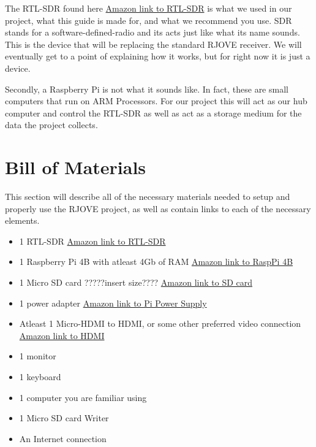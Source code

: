 \documentclass[letterpaper,12pt,notitlepage]{report} %
\begin{document}
The RTL-SDR found here \href{https://www.amazon.com/RTL-SDR-Blog-RTL2832U-Software-Defined/dp/B0129EBDS2}{Amazon link to RTL-SDR} is what we used in our project, what this guide is made for, and what we recommend you use. SDR stands for a software-defined-radio and its acts just like what its name sounds. This is the device that will be replacing the standard RJOVE receiver. We will eventually get to a point of explaining how it works, but for right now it is just a device.

Secondly, a Raspberry Pi is not what it sounds like. In fact, these are small computers that run on ARM Processors. For our project this will act as our hub computer and control the RTL-SDR as well as act as a storage medium for the data the project collects.

\section{Bill of Materials}
This section will describe all of the necessary materials needed to setup and properly use the RJOVE project, as well as contain links to each of the necessary elements.
\begin{itemize}
	\item 1 RTL-SDR \href{https://www.amazon.com/RTL-SDR-Blog-RTL2832U-Software-Defined/dp/B0129EBDS2}{Amazon link to RTL-SDR}
	\item 1 Raspberry Pi 4B with atleast 4Gb of RAM \href{https://www.amazon.com/Raspberry-Model-2019-Quad-Bluetooth/dp/B07TC2BK1X/ref=sr_1_3?dchild=1&keywords=raspberry+pi+4&qid=1616547693&sr=8-3}{Amazon link to RaspPi 4B}
	\item 1 Micro SD card ?????insert size???? \href{https://www.amazon.com/Silicon-Power-Superior-MicroSD-Adapter/dp/B07S5QW5V3/ref=sr_1_23?_encoding=UTF8&c=ts&dchild=1&keywords=Micro+SD+Memory+Cards&qid=1616547894&s=pc&sr=1-23&ts_id=3015433011}{Amazon link to SD card}
	\item 1 power adapter \href{https://www.amazon.com/CanaKit-Raspberry-Power-Supply-USB-C/dp/B07TYQRXTK/ref=sr_1_4?dchild=1&keywords=raspberry+pi+4+charger&qid=1616547982&s=electronics&sr=1-4}{Amazon link to Pi Power Supply}
	\item Atleast 1 Micro-HDMI to HDMI, or some other preferred video connection \href{https://www.amazon.com/UGREEN-Adapter-Ethernet-Compatible-Raspberry/dp/B06WWQ7KLV/ref=sr_1_3?dchild=1&keywords=micro+hdmi&qid=1616548064&s=electronics&sr=1-3}{Amazon link to HDMI}
	\item 1 monitor
	\item 1 keyboard
	\item 1 computer you are familiar using
	\item 1 Micro SD card Writer
	\item An Internet connection
\end{itemize}
\end{document}
